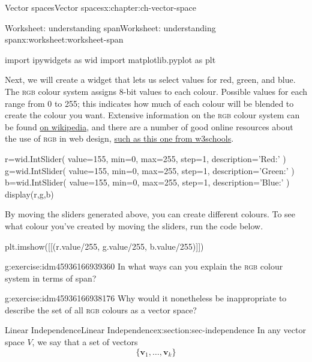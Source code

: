 \documentclass[oneside,10pt,]{book}
\newcommand{\initialism}[1]{\textsc{\MakeLowercase{#1}}}
\numberwithin{equation}{section}
\newcommand{\vv}{\mathbf{v}}
\begin{document}
\begin{chapterptx}{Vector spaces}{}{Vector spaces}{}{}{x:chapter:ch-vector-space}
\begin{worksheet-section}{Worksheet: understanding span}{}{Worksheet: understanding span}{}{}{x:worksheet:worksheet-span}
\begin{sageinput}
import ipywidgets as wid
import matplotlib.pyplot as plt
\end{sageinput}
Next, we will create a widget that lets us select values for red, green, and blue. The \initialism{RGB} colour system assigns 8-bit values to each colour. Possible values for each range from 0 to 255; this indicates how much of each colour will be blended to create the colour you want. Extensive information on the \initialism{RGB} colour system can be found \href{https://en.wikipedia.org/wiki/RGB_color_model}{on wikipedia}, and there are a number of good online resources about the use of \initialism{RGB} in web design, \href{https://www.w3schools.com/colors/colors_rgb.asp}{such as this one from w3schools}.%
\begin{sageinput}
r=wid.IntSlider(
    value=155,
    min=0,
    max=255,
    step=1,
    description='Red:'
)
g=wid.IntSlider(
    value=155,
    min=0,
    max=255,
    step=1,
    description='Green:'
)
b=wid.IntSlider(
    value=155,
    min=0,
    max=255,
    step=1,
    description='Blue:'
)
display(r,g,b)
\end{sageinput}
By moving the sliders generated above, you can create different colours. To see what colour you've created by moving the sliders, run the code below.%
\begin{sageinput}
plt.imshow([[(r.value/255, g.value/255, b.value/255)]])
\end{sageinput}
\begin{divisionexercise}{3}{}{}{g:exercise:idm45936166939360}%
In what ways can you explain the \initialism{RGB} colour system in terms of span?%
\end{divisionexercise}%
\begin{divisionexercise}{4}{}{}{g:exercise:idm45936166938176}%
Why would it nonetheless be inappropriate to describe the set of all \initialism{RGB} colours as a vector space?%
\end{divisionexercise}%
\end{worksheet-section}
\restoregeometry
%
%
\typeout{************************************************}
\typeout{************************************************}
%
\begin{sectionptx}{Linear Independence}{}{Linear Independence}{}{}{x:section:sec-independence}
In any vector space \(V\), we say that a set of vectors%
\begin{equation*}
\{\vv_1,\ldots,\vv_k\}
\end{equation*}

\end{sectionptx}
\end{chapterptx}
\end{document}

